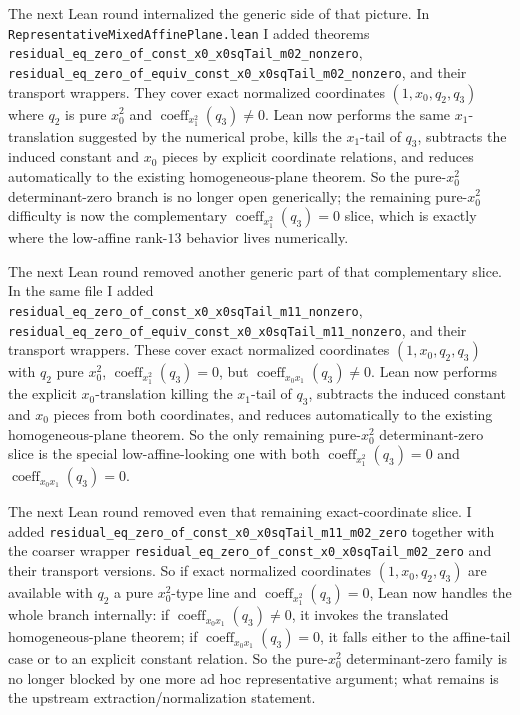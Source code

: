 \documentclass[11pt]{article}
\begin{document}
The next Lean round internalized the generic side of that picture. In
\texttt{RepresentativeMixedAffinePlane.lean} I added theorems
\texttt{residual\_eq\_zero\_of\_const\_x0\_x0sqTail\_m02\_nonzero},
\texttt{residual\_eq\_zero\_of\_equiv\_const\_x0\_x0sqTail\_m02\_nonzero}, and
their transport wrappers. They cover exact normalized coordinates
\((1,x_0,q_2,q_3)\) where \(q_2\) is pure \(x_0^2\) and
\(\operatorname{coeff}_{x_1^2}(q_3)\neq 0\). Lean now performs the same
\(x_1\)-translation suggested by the numerical probe, kills the \(x_1\)-tail
of \(q_3\), subtracts the induced constant and \(x_0\) pieces by explicit
coordinate relations, and reduces automatically to the existing
homogeneous-plane theorem. So the pure-\(x_0^2\) determinant-zero branch is no
longer open generically; the remaining pure-\(x_0^2\) difficulty is now the
complementary \(\operatorname{coeff}_{x_1^2}(q_3)=0\) slice, which is exactly
where the low-affine rank-\(13\) behavior lives numerically.

The next Lean round removed another generic part of that complementary slice.
In the same file I added
\texttt{residual\_eq\_zero\_of\_const\_x0\_x0sqTail\_m11\_nonzero},
\texttt{residual\_eq\_zero\_of\_equiv\_const\_x0\_x0sqTail\_m11\_nonzero}, and
their transport wrappers. These cover exact normalized coordinates
\((1,x_0,q_2,q_3)\) with \(q_2\) pure \(x_0^2\),
\(\operatorname{coeff}_{x_1^2}(q_3)=0\), but
\(\operatorname{coeff}_{x_0x_1}(q_3)\neq 0\). Lean now performs the explicit
\(x_0\)-translation killing the \(x_1\)-tail of \(q_3\), subtracts the induced
constant and \(x_0\) pieces from both coordinates, and reduces automatically to
the existing homogeneous-plane theorem. So the only remaining pure-\(x_0^2\)
determinant-zero slice is the special low-affine-looking one with both
\(\operatorname{coeff}_{x_1^2}(q_3)=0\) and
\(\operatorname{coeff}_{x_0x_1}(q_3)=0\).

The next Lean round removed even that remaining exact-coordinate slice. I added
\texttt{residual\_eq\_zero\_of\_const\_x0\_x0sqTail\_m11\_m02\_zero} together
with the coarser wrapper
\texttt{residual\_eq\_zero\_of\_const\_x0\_x0sqTail\_m02\_zero} and their
transport versions. So if exact normalized coordinates
\((1,x_0,q_2,q_3)\) are available with \(q_2\) a pure \(x_0^2\)-type line and
\(\operatorname{coeff}_{x_1^2}(q_3)=0\), Lean now handles the whole branch
internally: if \(\operatorname{coeff}_{x_0x_1}(q_3)\neq 0\), it invokes the
translated homogeneous-plane theorem; if
\(\operatorname{coeff}_{x_0x_1}(q_3)=0\), it falls either to the affine-tail
case or to an explicit constant relation. So the pure-\(x_0^2\)
determinant-zero family is no longer blocked by one more ad hoc representative
argument; what remains is the upstream extraction/normalization statement.
\end{document}
